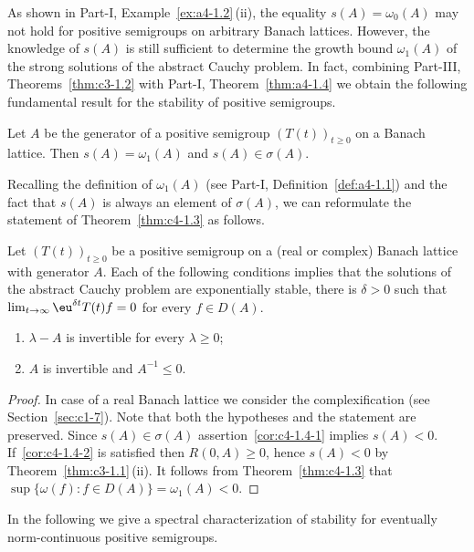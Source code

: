 As shown in Part-I, Example~\ref{ex:a4-1.2}\,(ii), the equality $s(A) = \omega_{0}(A)$ may not hold for positive semigroups on arbitrary Banach lattices.
However, the knowledge of\/ $s(A)$ is still sufficient to determine the growth bound $\omega_{1}(A)$ of the strong solutions of the abstract Cauchy problem.
In fact, combining 
Part-III, Theorems~\ref{thm:c3-1.2}  with 
Part-I, Theorem~\ref{thm:a4-1.4} 
we obtain the following fundamental result for the stability of positive semigroups.
\begin{theorem}\label{thm:c4-1.3}
Let $A$ be the generator of a positive semigroup $(T(t))_{t\geq 0}$ on a Banach lattice.
Then $s(A) = \omega_{1}(A)$ and $s(A) \in \sigma(A)$.
\end{theorem}
Recalling the definition of\/ $\omega_{1}(A)$ 
(see Part-I, Definition~\ref{def:a4-1.1}) 
and the fact that $s(A)$ is always an element of\/ $\sigma(A)$, we can reformulate the statement of Theorem~\ref{thm:c4-1.3} as follows.
\begin{corollary}\label{cor:c4-1.4}%
Let $(T(t))_{t\geq 0}$ be a positive semigroup on a (real or complex) Banach lattice with generator $A$.
Each of the following conditions implies that the solutions of the abstract Cauchy problem are exponentially stable, \ie  there is $\delta > 0$ such that $\lim_{t \to \infty} \eu^{\delta t}T(t)f = 0$ for every $f \in D(A)$.
\begin{enumerate}[\upshape (i)]
    \item \label{cor:c4-1.4-1}
    $\lambda - A$ is invertible for every $\lambda \geq 0$;
    \item \label{cor:c4-1.4-2}
    $A$ is invertible and $A^{-1} \leq 0$.
    \end{enumerate}
\end{corollary}
\begin{proof}
In case of a real Banach lattice we consider the complexification 
(see Section~\ref{sec:c1-7}).
Note that both the hypotheses and the statement are preserved.
Since $s(A) \in \sigma(A)$ assertion~\ref{cor:c4-1.4-1} implies $s(A) < 0$.
If~\ref{cor:c4-1.4-2} is satisfied then $R(0,A) \geq 0$, hence $s(A) < 0$ by Theorem~\ref{thm:c3-1.1}\,(ii).
It follows from Theorem~\ref{thm:c4-1.3} that $\sup\{\omega(f) \colon f \in D(A)\} = \omega_{1}(A) < 0$.
\end{proof}
In the following we give a spectral characterization of stability for eventually norm-continuous positive semigroups.
